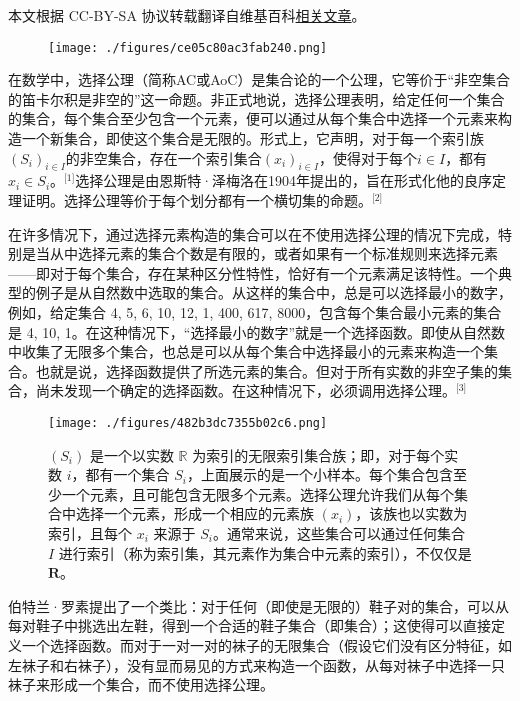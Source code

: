 
本文根据 CC-BY-SA 协议转载翻译自维基百科\href{https://en.wikipedia.org/wiki/Axiom_of_choice}{相关文章}。

\begin{figure}[ht]
\centering
\texttt{[image: ./figures/ce05c80ac3fab240.png]}
\caption{} \label{fig_AC_1}
\end{figure}
在数学中，选择公理（简称AC或AoC）是集合论的一个公理，它等价于“非空集合的笛卡尔积是非空的”这一命题。非正式地说，选择公理表明，给定任何一个集合的集合，每个集合至少包含一个元素，便可以通过从每个集合中选择一个元素来构造一个新集合，即使这个集合是无限的。形式上，它声明，对于每一个索引族\( (S_i)_{i \in I} \)的非空集合，存在一个索引集合\( (x_i)_{i \in I} \)，使得对于每个\( i \in I \)，都有\( x_i \in S_i\)。\(^\text{[1]}\)选择公理是由恩斯特·泽梅洛在1904年提出的，旨在形式化他的良序定理证明。选择公理等价于每个划分都有一个横切集的命题。\(^\text{[2]}\)

在许多情况下，通过选择元素构造的集合可以在不使用选择公理的情况下完成，特别是当从中选择元素的集合个数是有限的，或者如果有一个标准规则来选择元素——即对于每个集合，存在某种区分性特性，恰好有一个元素满足该特性。一个典型的例子是从自然数中选取的集合。从这样的集合中，总是可以选择最小的数字，例如，给定集合 {{4, 5, 6}, {10, 12}, {1, 400, 617, 8000}}，包含每个集合最小元素的集合是 {4, 10, 1}。在这种情况下，“选择最小的数字”就是一个选择函数。即使从自然数中收集了无限多个集合，也总是可以从每个集合中选择最小的元素来构造一个集合。也就是说，选择函数提供了所选元素的集合。但对于所有实数的非空子集的集合，尚未发现一个确定的选择函数。在这种情况下，必须调用选择公理。\(^\text{[3]}\)
\begin{figure}[ht]
\centering
\texttt{[image: ./figures/482b3dc7355b02c6.png]}
\caption{\((S_i)\) 是一个以实数 \(\mathbb{R}\) 为索引的无限索引集合族；即，对于每个实数 \(i\)，都有一个集合 \(S_i\)，上面展示的是一个小样本。每个集合包含至少一个元素，且可能包含无限多个元素。选择公理允许我们从每个集合中选择一个元素，形成一个相应的元素族 \((x_i)\)，该族也以实数为索引，且每个 \(x_i\) 来源于 \(S_i\)。通常来说，这些集合可以通过任何集合 \(I\) 进行索引（称为索引集，其元素作为集合中元素的索引），不仅仅是 \(\mathbf{R}\)。} \label{fig_AC_2}
\end{figure}
伯特兰·罗素提出了一个类比：对于任何（即使是无限的）鞋子对的集合，可以从每对鞋子中挑选出左鞋，得到一个合适的鞋子集合（即集合）；这使得可以直接定义一个选择函数。而对于一对一对的袜子的无限集合（假设它们没有区分特征，如左袜子和右袜子），没有显而易见的方式来构造一个函数，从每对袜子中选择一只袜子来形成一个集合，而不使用选择公理。

